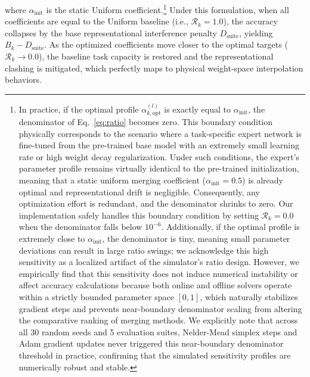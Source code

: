 where $\alpha_{\text{init}}$ is the static Uniform coefficient.\footnote{In practice, if the optimal profile $\alpha_{k, \text{opt}}^{(l)}$ is exactly equal to $\alpha_{\text{init}}$, the denominator of Eq.~\eqref{eq:ratio} becomes zero.
This boundary condition physically corresponds to the scenario where a task-specific expert network is fine-tuned from the pre-trained base model with an extremely small learning rate or high weight decay regularization.
Under such conditions, the expert's parameter profile remains virtually identical to the pre-trained initialization, meaning that a static uniform merging coefficient ($\alpha_{\text{init}} = 0.5$) is already optimal and representational drift is negligible.
Consequently, any optimization effort is redundant, and the denominator shrinks to zero.
Our implementation safely handles this boundary condition by setting $\mathcal{R}_k = 0.0$ when the denominator falls below $10^{-6}$.
Additionally, if the optimal profile is extremely close to $\alpha_{\text{init}}$, the denominator is tiny, meaning small parameter deviations can result in large ratio swings; we acknowledge this high sensitivity as a localized artifact of the simulator's ratio design.
However, we empirically find that this sensitivity does not induce numerical instability or affect accuracy calculations because both online and offline solvers operate within a strictly bounded parameter space $[0, 1]$, which naturally stabilizes gradient steps and prevents near-boundary denominator scaling from altering the comparative ranking of merging methods.
We explicitly note that across all 30 random seeds and 5 evaluation suites, Nelder-Mead simplex steps and Adam gradient updates never triggered this near-boundary denominator threshold in practice, confirming that the simulated sensitivity profiles are numerically robust and stable.} Under this formulation, when all coefficients are equal to the Uniform baseline (i.e., $\mathcal{R}_k = 1.0$), the accuracy collapses by the base representational interference penalty $D_{\text{suite}}$, yielding $B_k - D_{\text{suite}}$.
As the optimized coefficients move closer to the optimal targets ($\mathcal{R}_k \to 0.0$), the baseline task capacity is restored and the representational clashing is mitigated, which perfectly maps to physical weight-space interpolation behaviors.

